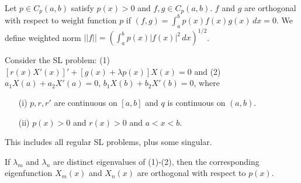 \documentclass[]{article}
\begin{document}
\begin{definition}
	Let $p\in C_p(a,b)$ satisfy $p(x)>0$ and $f,g\in C_p(a,b)$. $f$ and $g$ are orthogonal with respect to weight function $p$ if $(f,g) = \int_a^b p(x) f(x) g(x) \, dx = 0$.
	We define weighted norm $||f|| = \left( \int_a^b p(x) |f(x)|^2 \, dx \right)^{1/2}$.
\end{definition}
Consider the SL problem: (1) $[r(x) X'(x)]' + [g(x) + \lambda p(x)] X(x) = 0$ and (2) $a_1 X(a) + a_2 X'(a) = 0$, $b_1 X(b) + b_2 X'(b) = 0$, where
\begin{enumerate}
	\item[(i)] $p,r,r'$ are continuous on $[a,b]$ and $q$ is continuous on $(a,b)$.
	\item[(ii)] $p(x) > 0$ and $r(x) > 0$ and $a<x<b$.
\end{enumerate}
This includes all regular SL problems, plus some singular.
\begin{theorem}
	If $\lambda_m$ and $\lambda_n$ are distinct eigenvalues of (1)-(2), then the corresponding eigenfunction $X_m(x)$ and $X_n(x)$ are orthogonal with respect to $p(x)$.
\end{theorem}
\end{document}
